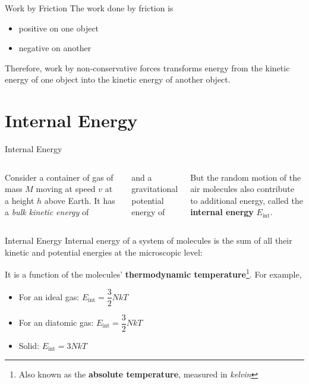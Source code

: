\documentclass[12pt,compress,aspectratio=169]{beamer}
\begin{document}
\begin{frame}{Work by Friction}
  The work done by friction is
  \begin{itemize}
  \item positive on one object
  \item negative on another
  \end{itemize}
  Therefore, work by non-conservative forces transforms energy from the kinetic
  energy of one object into the kinetic energy of another object.
\end{frame}




\section{Internal Energy}

\begin{frame}{Internal Energy}
  \begin{columns}

    Consider a container of gas of mass $M$ moving at speed $v$ at a height $h$
    above Earth. It has a \emph{bulk kinetic energy} of

    
    and a gravitational potential energy of


    But the random motion of the air molecules also contribute to additional
    energy, called the \textbf{internal energy} $E_\text{int}$.
  \end{columns}
\end{frame}



\begin{frame}{Internal Energy}
  Internal energy of a system of molecules is the sum of all their kinetic and
  potential energies at the microscopic level:


  \vspace{-.1in}It is a function of the molecules' \textbf{thermodynamic
    temperature}\footnote{Also known as the \textbf{absolute temperature},
    measured in \emph{kelvin}}. For example, 
  \begin{itemize}
  \item For an ideal gas: $E_\text{int}=\dfrac32NkT$
  \item For an diatomic gas: $E_\text{int}=\dfrac32NkT$
  \item Solid: $E_\text{int}=3NkT$
  \end{itemize}
\end{frame}
\end{document}
